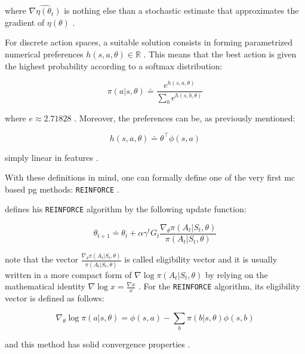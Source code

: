 where $ \widehat{\nabla \eta (\theta_t)}$ is nothing else than a stochastic estimate that approximates the gradient of $\eta(\theta)$ \citep[p. 265]{Sutton2017}.

For discrete action spaces, a suitable solution consists in forming parametrized numerical preferences $h(s,a,\theta) \in \mathbb{R}$ \citep[p. 266]{Sutton2017}. This means that the best action is given the highest probability according to a softmax distribution:

\begin{equation}
\label{eq:probabilistic_preferences}
	\pi(a|s,\theta) \doteq \frac{e^{h(s,a,\theta)}}{\sum_b e^{h(s,b,\theta)}}
\end{equation}

where $e \approx 2.71828$ \citep[p. 266]{Sutton2017}. Moreover, the preferences can be, as previously mentioned:

\begin{equation}
\label{eq:dot_preferences}
	h(s,a,\theta) \doteq \theta^\top \phi (s,a)
\end{equation}

simply linear in features \citep[p. 266]{Sutton2017}.

With these definitions in mind, one can formally define one of the very first \gls{mc} based \gls{pg} methods: \texttt{REINFORCE} \citep{Williams1992}.

\citet{Williams1992} defines his \texttt{REINFORCE} algorithm by the following update function:

\begin{equation}
	\theta_{t+1} \doteq \theta_t + \alpha \gamma^t G_t \frac{\nabla_\theta \pi(A_t|S_t,\theta)}{\pi(A_t|S_t,\theta)}
\end{equation}

note that the vector $\frac{\nabla_\theta \pi(A_t|S_t,\theta)}{\pi(A_t|S_t,\theta)}$ is called eligibility vector and it is usually written in a more compact form of $\nabla \log \pi(A_t|S_t,\theta)$ by relying on the mathematical identity $\nabla \log x = \frac{\nabla x}{x}$ \citep[p. 271]{Sutton2017}. For the \texttt{REINFORCE} algorithm, its eligibility vector is defined as follows:

\begin{equation}
	\nabla_\theta \log \pi (a|s,\theta) = \phi (s,a) - \sum_b \pi (b|s,\theta) \phi (s,b)
\end{equation}

and this method has solid convergence properties \citep[p. 271]{Sutton2017}.

